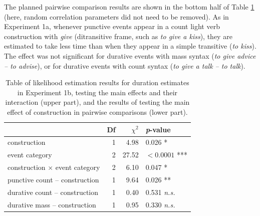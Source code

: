 \documentclass[preprint,12pt,authoryear]{elsarticle}
\begin{document}
The planned pairwise comparison results are shown in the bottom half of Table \ref{table_OE_BetwSubj} (here, random correlation parameters did not need to be removed). As in Experiment 1a, whenever punctive events appear in a count light verb construction with \emph{give} (ditransitive frame, such as\emph{ to give a kiss}), they are estimated to take less time than when they appear in a simple transitive (\emph{to kiss}). The effect was not significant for durative events with mass syntax (\emph{to give advice -- to advise}), or for durative events with count syntax (\emph{to give a talk -- to talk}).

\begin{table}[ht]
\centering
\begin{tabular}{lrrl}
 \hline
 & Df &  $\chi^2$ & \emph{p}-value \\ 
  \hline
construction          & 1 &  4.98 & 0.026 * \\ 
  event category          & 2 &  27.52 & $<0.0001$ ***\\ 
  construction $\times$ event category & 2 & 6.10 & 0.047 * \\    \hline
   punctive count -- construction    & 1 & 9.64 & 0.026 ** \\    
   durative count -- construction    & 1  & 0.40 & 0.531 \emph{n.s.}\\ 
   durative mass -- construction   & 1 &  0.95 & 0.330 \emph{n.s.} \\ \hline
\end{tabular}
\caption{Table of likelihood estimation results for duration estimates in Experiment 1b, testing the main effects and their interaction (upper part), and the results of testing the main effect of construction in pairwise comparisons (lower part).}
\label{table_OE_BetwSubj}
\end{table}
\end{document}
